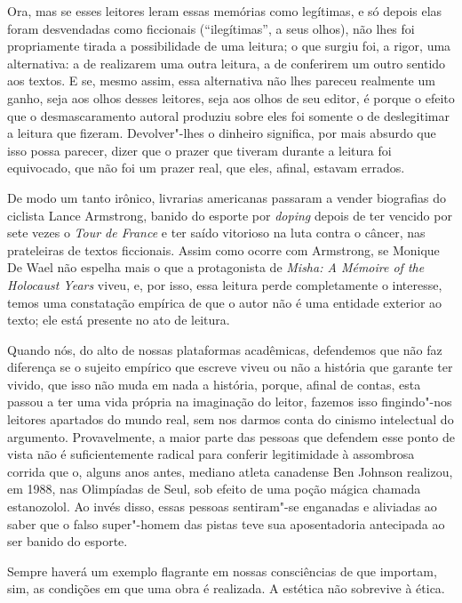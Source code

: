 Ora, mas se esses leitores leram essas memórias como legítimas, e só
depois elas foram desvendadas como ficcionais (``ilegítimas'', a seus
olhos), não lhes foi propriamente tirada a possibilidade de uma leitura;
o que surgiu foi, a rigor, uma alternativa: a de realizarem uma outra
leitura, a de conferirem um outro sentido aos textos. E se, mesmo assim,
essa alternativa não lhes pareceu realmente um ganho, seja aos olhos
desses leitores, seja aos olhos de seu editor, é porque o efeito que o
desmascaramento autoral produziu sobre eles foi somente o de
deslegitimar a leitura que fizeram. Devolver"-lhes o dinheiro significa,
por mais absurdo que isso possa parecer, dizer que o prazer que tiveram
durante a leitura foi equivocado, que não foi um prazer real, que eles,
afinal, estavam errados.

De modo um tanto irônico, livrarias americanas passaram a vender
biografias do ciclista Lance Armstrong, banido do esporte por
\emph{doping} depois de ter vencido por sete vezes o \emph{Tour de
France} e ter saído vitorioso na luta contra o câncer, nas prateleiras
de textos ficcionais. Assim como ocorre com Armstrong, se Monique De
Wael não espelha mais o que a protagonista de \emph{Misha: A Mémoire of
the Holocaust Years} viveu, e, por isso, essa leitura perde
completamente o interesse, temos uma constatação empírica de que o autor
não é uma entidade exterior ao texto; ele está presente no ato de
leitura.

Quando nós, do alto de nossas plataformas acadêmicas, defendemos que não
faz diferença se o sujeito empírico que escreve viveu ou não a história
que garante ter vivido, que isso não muda em nada a história, porque,
afinal de contas, esta passou a ter uma vida própria na imaginação do
leitor, fazemos isso fingindo"-nos leitores apartados do mundo real, sem
nos darmos conta do cinismo intelectual do argumento. Provavelmente, a
maior parte das pessoas que defendem esse ponto de vista não é
suficientemente radical para conferir legitimidade à assombrosa corrida
que o, alguns anos antes, mediano atleta canadense Ben Johnson realizou,
em 1988, nas Olimpíadas de Seul, sob efeito de uma poção mágica chamada
estanozolol. Ao invés disso, essas pessoas sentiram"-se enganadas e
aliviadas ao saber que o falso super"-homem das pistas teve sua
aposentadoria antecipada ao ser banido do esporte.

Sempre haverá um exemplo flagrante em nossas consciências de que
importam, sim, as condições em que uma obra é realizada. A estética não
sobrevive à ética.

